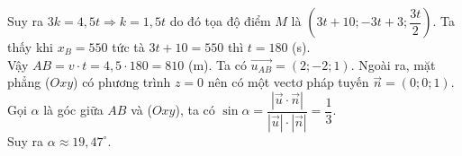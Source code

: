 \begin{ex}
{\begin{itemchoice}
            Suy ra $3k=4{,}5t \Rightarrow k=1{,}5t$ do đó tọa độ điểm $M$ là $\left(3t+10;-3t+3; \dfrac{3t}{2}\right)$.
            \itemch Ta thấy khi $x_B=550$ tức tà $3t+10=550$ thì $t=180$ (s).\\
            Vậy $AB=v\cdot t=4{,}5\cdot 180=810$ (m).
            \itemch Ta có $\overrightarrow{u_{AB}}=(2;-2;1)$. Ngoài ra, mặt phẳng ($Oxy$) có phương trình $z=0$ nên có một vectơ pháp tuyến $\overrightarrow{n}=(0;0;1)$.\\
            Gọi $\alpha$ là góc giữa $AB$ và ($Oxy$), ta có $\sin \alpha=\dfrac{|\overrightarrow{u}\cdot \vec{n}|}{|\overrightarrow{u}|\cdot|\overrightarrow{n}|}=\dfrac{1}{3}$.\\
            Suy ra $\alpha\approx 19{,}47^\circ$.
        \end{itemchoice}
    }
\end{ex}


